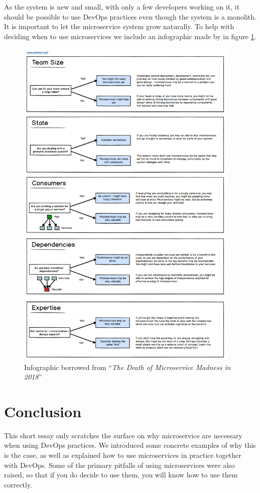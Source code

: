 \documentclass[a4paper]{article}
\begin{document}
As the system is new and small, with only a few developers working on it, it should be possible to use DevOps practices even though the system is a monolith. It is important to let the microservice system grow naturally. To help with deciding when to use microservices we include an infographic made by \citeauthor{Kerr} in figure \ref{fig:questions}.

\begin{figure}
    \centering
    \includegraphics[width=0.95\textwidth]{microservice-questions.png}
    \caption{Infographic borrowed from ``\textit{The Death of Microservice Madness in 2018}'' \cite{Kerr}}
    \label{fig:questions}
\end{figure}

\section{Conclusion}
This short essay only scratches the surface on why microservice are necessary when using DevOps practices. We introduced some concrete examples of why this is the case, as well as explained how to use microservices in practice together with DevOps. Some of the primary pitfalls of using microservices were also raised, so that if you do decide to use them, you will know how to use them correctly.
\end{document}
